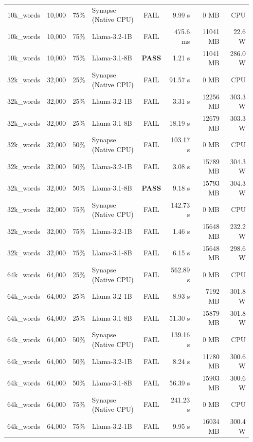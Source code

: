 {\begin{longtable}{p{1.6cm} p{1.6cm} c p{3.4cm} c r r r}
10k\_words & 10,000 & 75\% & Synapse (Native CPU) & \color{gray}FAIL & 9.99 s & 0 MB & CPU \\
10k\_words & 10,000 & 75\% & Llama-3.2-1B & \color{gray}FAIL & 475.6 ms & 11041 MB & 22.6 W \\
10k\_words & 10,000 & 75\% & Llama-3.1-8B & \textbf{\color{passgreen}PASS} & 1.21 s & 11041 MB & 286.0 W \\
32k\_words & 32,000 & 25\% & Synapse (Native CPU) & \color{gray}FAIL & 91.57 s & 0 MB & CPU \\
32k\_words & 32,000 & 25\% & Llama-3.2-1B & \color{gray}FAIL & 3.31 s & 12256 MB & 303.3 W \\
32k\_words & 32,000 & 25\% & Llama-3.1-8B & \color{gray}FAIL & 18.19 s & 12679 MB & 303.3 W \\
32k\_words & 32,000 & 50\% & Synapse (Native CPU) & \color{gray}FAIL & 103.17 s & 0 MB & CPU \\
32k\_words & 32,000 & 50\% & Llama-3.2-1B & \color{gray}FAIL & 3.08 s & 15789 MB & 304.3 W \\
32k\_words & 32,000 & 50\% & Llama-3.1-8B & \textbf{\color{passgreen}PASS} & 9.18 s & 15793 MB & 304.3 W \\
32k\_words & 32,000 & 75\% & Synapse (Native CPU) & \color{gray}FAIL & 142.73 s & 0 MB & CPU \\
32k\_words & 32,000 & 75\% & Llama-3.2-1B & \color{gray}FAIL & 1.46 s & 15648 MB & 232.2 W \\
32k\_words & 32,000 & 75\% & Llama-3.1-8B & \color{gray}FAIL & 6.15 s & 15648 MB & 298.6 W \\
64k\_words & 64,000 & 25\% & Synapse (Native CPU) & \color{gray}FAIL & 562.89 s & 0 MB & CPU \\
64k\_words & 64,000 & 25\% & Llama-3.2-1B & \color{gray}FAIL & 8.93 s & 7192 MB & 301.8 W \\
64k\_words & 64,000 & 25\% & Llama-3.1-8B & \color{gray}FAIL & 51.30 s & 15879 MB & 301.8 W \\
64k\_words & 64,000 & 50\% & Synapse (Native CPU) & \color{gray}FAIL & 139.16 s & 0 MB & CPU \\
64k\_words & 64,000 & 50\% & Llama-3.2-1B & \color{gray}FAIL & 8.24 s & 11780 MB & 300.6 W \\
64k\_words & 64,000 & 50\% & Llama-3.1-8B & \color{gray}FAIL & 56.39 s & 15903 MB & 300.6 W \\
64k\_words & 64,000 & 75\% & Synapse (Native CPU) & \color{gray}FAIL & 241.23 s & 0 MB & CPU \\
64k\_words & 64,000 & 75\% & Llama-3.2-1B & \color{gray}FAIL & 9.95 s & 16034 MB & 300.4 W \\

\end{longtable}}
